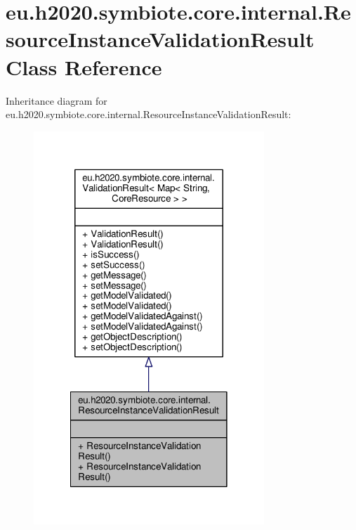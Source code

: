 \hypertarget{classeu_1_1h2020_1_1symbiote_1_1core_1_1internal_1_1ResourceInstanceValidationResult}{}\section{eu.\+h2020.\+symbiote.\+core.\+internal.\+Resource\+Instance\+Validation\+Result Class Reference}
\label{classeu_1_1h2020_1_1symbiote_1_1core_1_1internal_1_1ResourceInstanceValidationResult}


Inheritance diagram for eu.\+h2020.\+symbiote.\+core.\+internal.\+Resource\+Instance\+Validation\+Result\+:
\nopagebreak
\begin{figure}[H]
\begin{center}
\leavevmode
\includegraphics[width=246pt]{classeu_1_1h2020_1_1symbiote_1_1core_1_1internal_1_1ResourceInstanceValidationResult__inherit__graph}
\end{center}
\end{figure}


